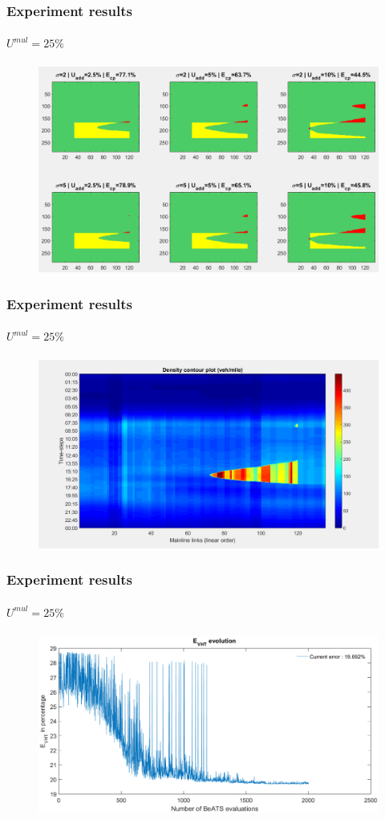 \documentclass[fleqn]{beamer}
\begin{document}
\begin{frame}
	\frametitle{Experiment results}
	\framesubtitle{$U^{mul}=25\% $}
	\begin{figure}
		\centering
		\includegraphics[width=4.5in]{figures/results_figures/Umul/cp_Umul_25_lambda_11.png}
	\end{figure}
\end{frame}

\begin{frame}
	\frametitle{Experiment results}
	\framesubtitle{$U^{mul}=25\% $}
	\begin{figure}
		\centering
		\includegraphics[width=4.5in]{figures/results_figures/Umul/13_2_too_tight_contour.png}
	\end{figure}
\end{frame}


\begin{frame}
	\frametitle{Experiment results}
	\framesubtitle{$U^{mul}=25\% $}
	\begin{figure}
		\centering
		\includegraphics[width=4.5in]{figures/results_figures/Umul/bad_vht.png}
	\end{figure}
\end{frame}
\end{document}
